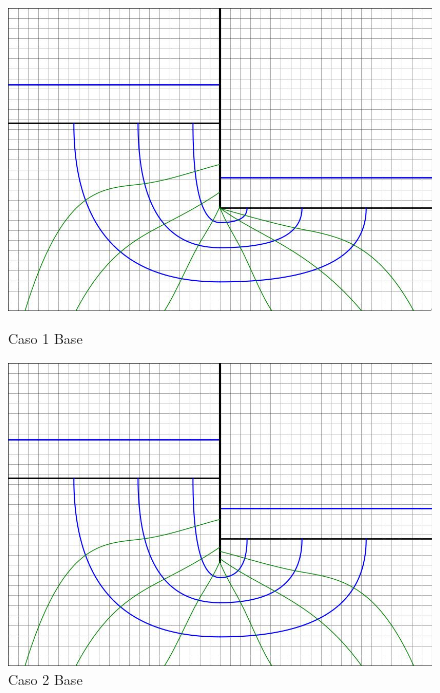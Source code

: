 \begin{figure}[H]
  \centering
  \begin{minipage}{0.32\textwidth}
      \centering
      \includegraphics[width=\textwidth]{FOTOS/caso_1dibujo_base.jpg}
      \caption{Caso 1 Base}
  \end{minipage}
  \begin{minipage}{0.32\textwidth}
      \centering
      \includegraphics[width=\textwidth]{FOTOS/caso_2dibujo_base.jpg}
      \caption{Caso 2 Base}
  \end{minipage}
  \begin{minipage}{0.32\textwidth}
      \centering

\end{minipage}
\end{figure}
